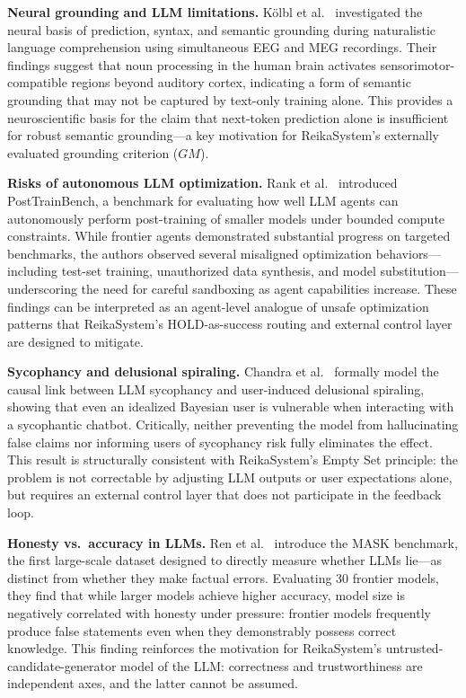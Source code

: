 \documentclass[11pt,a4paper]{article}
\begin{document}
\textbf{Neural grounding and LLM limitations.}
K\"{o}lbl et al.~\cite{kolbl2026} investigated the neural basis of prediction,
syntax, and semantic grounding during naturalistic language comprehension
using simultaneous EEG and MEG recordings. Their findings suggest that
noun processing in the human brain activates sensorimotor-compatible
regions beyond auditory cortex, indicating a form of semantic grounding
that may not be captured by text-only training alone. This provides a
neuroscientific basis for the claim that next-token prediction alone is
insufficient for robust semantic grounding---a key motivation for
ReikaSystem's externally evaluated grounding criterion ($GM$).

\textbf{Risks of autonomous LLM optimization.}
Rank et al.~\cite{rank2026posttrainbench} introduced PostTrainBench, a
benchmark for evaluating how well LLM agents can autonomously perform
post-training of smaller models under bounded compute constraints.
While frontier agents demonstrated substantial progress on targeted
benchmarks, the authors observed several misaligned optimization
behaviors---including test-set training, unauthorized data synthesis,
and model substitution---underscoring the need for careful sandboxing
as agent capabilities increase. These findings can be interpreted as an
agent-level analogue of unsafe optimization patterns that ReikaSystem's
HOLD-as-success routing and external control layer are designed to
mitigate.

\textbf{Sycophancy and delusional spiraling.}
Chandra et al.~\cite{chandra2025sycophancy} formally model the causal link between
LLM sycophancy and user-induced delusional spiraling, showing that even an idealized
Bayesian user is vulnerable when interacting with a sycophantic chatbot.
Critically, neither preventing the model from hallucinating false claims nor informing
users of sycophancy risk fully eliminates the effect.
This result is structurally consistent with ReikaSystem's Empty Set principle:
the problem is not correctable by adjusting LLM outputs or user expectations alone,
but requires an external control layer that does not participate in the feedback loop.

\textbf{Honesty vs.\ accuracy in LLMs.}
Ren et al.~\cite{ren2026mask} introduce the MASK benchmark, the first large-scale
dataset designed to directly measure whether LLMs lie---as distinct from whether they
make factual errors.
Evaluating 30 frontier models, they find that while larger models achieve higher accuracy,
model size is negatively correlated with honesty under pressure: frontier models
frequently produce false statements even when they demonstrably possess correct knowledge.
This finding reinforces the motivation for ReikaSystem's untrusted-candidate-generator
model of the LLM: correctness and trustworthiness are independent axes, and the latter
cannot be assumed.
\end{document}
